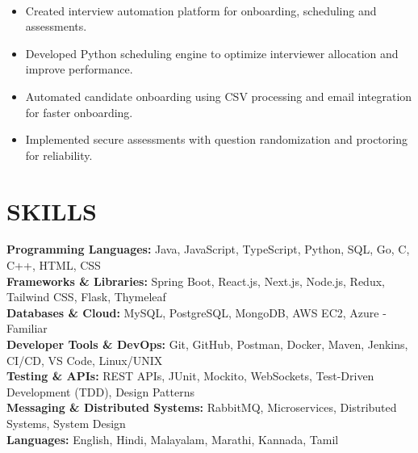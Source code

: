 \documentclass[10pt,a4paper]{article}
\begin{document}
\noindent
{}\\[-12pt]

\begin{itemize}

\item Created interview automation platform for onboarding, scheduling and assessments.

\item Developed Python scheduling engine to optimize interviewer allocation and improve performance.

\item Automated candidate onboarding using CSV processing and email integration for faster onboarding.

\item Implemented secure assessments with question randomization and proctoring for reliability.

\end{itemize}
\section*{SKILLS}

\small

\textbf{Programming Languages:}
Java, JavaScript, TypeScript, Python, SQL, Go, C, C++, HTML, CSS
\\[2pt]
\textbf{Frameworks \& Libraries:}
Spring Boot, React.js, Next.js, Node.js, Redux, Tailwind CSS, Flask, Thymeleaf
\\[2pt]
\textbf{Databases \& Cloud:}
MySQL, PostgreSQL, MongoDB, AWS EC2, Azure - Familiar
\\[2pt]
\textbf{Developer Tools \& DevOps:}
Git, GitHub, Postman, Docker, Maven, Jenkins, CI/CD, VS Code, Linux/UNIX
\\[2pt]
\textbf{Testing \& APIs:}
REST APIs, JUnit, Mockito, WebSockets, Test-Driven Development (TDD), Design Patterns
\\[2pt]
\textbf{Messaging \& Distributed Systems:}
RabbitMQ, Microservices, Distributed Systems, System Design
\\[2pt]
\textbf{Languages:}
English, Hindi, Malayalam, Marathi, Kannada, Tamil

\end{document}
